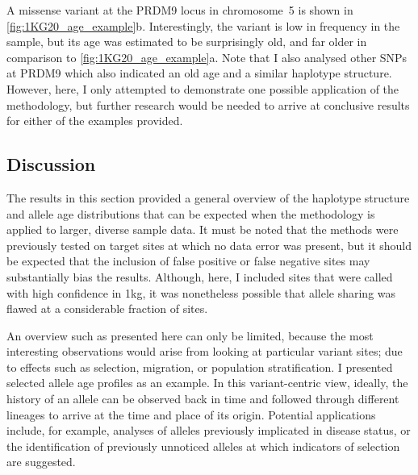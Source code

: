 A missense variant at the PRDM9 locus in chromosome~5 is shown in \cref{fig:1KG20_age_example}{b}.
Interestingly, the variant is low in frequency in the sample, but its age was estimated to be surprisingly old, and far older in comparison to \cref{fig:1KG20_age_example}{a}.
Note that I also analysed other SNPs at PRDM9 which also indicated an old age and a similar haplotype structure.
However, here, I only attempted to demonstrate one possible application of the methodology, but further research would be needed to arrive at conclusive results for either of the examples provided.




%
% 
%


%
\subsection{Discussion}
%

The results in this section provided a general overview of the haplotype structure and allele age distributions that can be expected when the methodology is applied to larger, diverse sample data.
It must be noted that the methods were previously tested on target sites at which no data error was present, but it should be expected that the inclusion of false positive or false negative sites may substantially bias the results.
Although, here, I included sites that were called with high confidence in \gls{1kg}, it was nonetheless possible that allele sharing was flawed at a considerable fraction of sites.

An overview such as presented here can only be limited, because the most interesting observations would arise from looking at particular variant sites; \eg due to effects such as selection, migration, or population stratification.
I presented selected allele age profiles as an example.
In this variant-centric view, ideally, the history of an allele can be observed back in time and followed through different lineages to arrive at the time and place of its origin.
Potential applications include, for example, analyses of alleles previously implicated in disease status, or the identification of previously unnoticed alleles at which indicators of selection are suggested.
